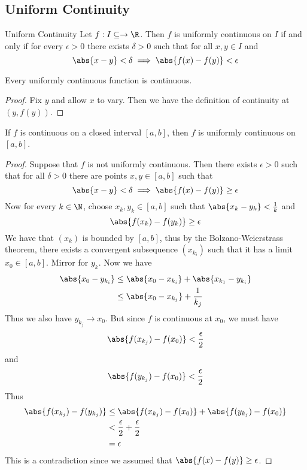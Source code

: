 \subsection{Uniform Continuity}
\begin{defn}{Uniform Continuity}{} Let $f:I\subseteq\to\R$. Then $f$ is uniformly continuous on $I$ if and only if for every $\epsilon>0$ there exists $\delta>0$ such that for all $x,y\in I$ and $$\abs{x-y}<\delta\implies\abs{f(x)-f(y)}<\epsilon$$ 
\end{defn}

\begin{prp}{}{} Every uniformly continuous function is continuous. \tcbline
\begin{proof} Fix $y$ and allow $x$ to vary. Then we have the definition of continuity at $(y,f(y))$. 
\end{proof}
\end{prp}

\begin{thm}{}{} If $f$ is continuous on a closed interval $[a,b]$, then $f$ is uniformly continuous on $[a,b]$. \tcbline
\begin{proof} Suppose that $f$ is not uniformly continuous. Then there exists $\epsilon>0$ such that for all $\delta>0$ there are points $x,y\in[a,b]$ such that $$\abs{x-y}<\delta\implies\abs{f(x)-f(y)}\geq\epsilon$$ Now for every $k\in\N$, choose $x_k,y_k\in[a,b]$ such that $\abs{x_k-y_k}<\frac{1}{k}$ and $$\abs{f(x_k)-f(y_k)}\geq\epsilon$$ We have that $(x_k)$ is bounded by $[a,b]$, thus by the Bolzano-Weierstrass theorem, there exists a convergent subsequence $(x_{k_i})$ such that it has a limit $x_0\in[a,b]$. Mirror for $y_k$. Now we have 
\begin{align*}
\abs{x_0-y_{k_i}}&\leq\abs{x_0-x_{k_i}}+\abs{x_{k_1}-y_{k_i}}\\
&\leq\abs{x_0-x_{k_j}}+\frac{1}{k_j}
\end{align*}
Thus we also have $y_{k_j}\to x_0$. But since $f$ is continuous at $x_0$, we must have $$\abs{f(x_{k_j})-f(x_0)}<\frac{\epsilon}{2}$$ and $$\abs{f(y_{k_j})-f(x_0)}<\frac{\epsilon}{2}$$ Thus
\begin{align*}
\abs{f(x_{k_j})-f(y_{k_j})}&\leq\abs{f(x_{k_j})-f(x_0)}+\abs{f(y_{k_j})-f(x_0)}\\
&<\frac{\epsilon}{2}+\frac{\epsilon}{2}\\
&=\epsilon
\end{align*} This is a contradiction since we assumed that $\abs{f(x)-f(y)}\geq\epsilon$. 
\end{proof}
\end{thm}

